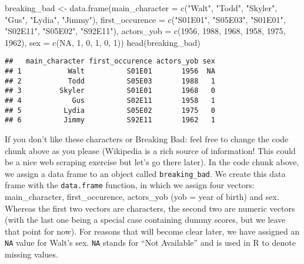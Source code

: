 \documentclass[
]{article}
\newenvironment{Shaded}{\begin{snugshade}}{\end{snugshade}}
\newcommand{\AttributeTok}[1]{\textcolor[rgb]{0.77,0.63,0.00}{#1}}
\newcommand{\ConstantTok}[1]{\textcolor[rgb]{0.00,0.00,0.00}{#1}}
\newcommand{\DecValTok}[1]{\textcolor[rgb]{0.00,0.00,0.81}{#1}}
\newcommand{\FunctionTok}[1]{\textcolor[rgb]{0.00,0.00,0.00}{#1}}
\newcommand{\NormalTok}[1]{#1}
\newcommand{\OtherTok}[1]{\textcolor[rgb]{0.56,0.35,0.01}{#1}}
\newcommand{\StringTok}[1]{\textcolor[rgb]{0.31,0.60,0.02}{#1}}
\begin{document}
\begin{Shaded}
\begin{Highlighting}[]
\NormalTok{breaking\_bad }\OtherTok{\textless{}{-}} \FunctionTok{data.frame}\NormalTok{(}\AttributeTok{main\_character =} \FunctionTok{c}\NormalTok{(}\StringTok{"Walt"}\NormalTok{, }\StringTok{"Todd"}\NormalTok{, }\StringTok{"Skyler"}\NormalTok{, }\StringTok{"Gus"}\NormalTok{, }\StringTok{"Lydia"}\NormalTok{, }\StringTok{"Jimmy"}\NormalTok{),}
                           \AttributeTok{first\_occurence =} \FunctionTok{c}\NormalTok{(}\StringTok{"S01E01"}\NormalTok{, }\StringTok{"S05E03"}\NormalTok{, }\StringTok{"S01E01"}\NormalTok{, }\StringTok{"S02E11"}\NormalTok{, }\StringTok{"S05E02"}\NormalTok{, }\StringTok{"S92E11"}\NormalTok{),}
                           \AttributeTok{actors\_yob =} \FunctionTok{c}\NormalTok{(}\DecValTok{1956}\NormalTok{, }\DecValTok{1988}\NormalTok{, }\DecValTok{1968}\NormalTok{, }\DecValTok{1958}\NormalTok{, }\DecValTok{1975}\NormalTok{, }\DecValTok{1962}\NormalTok{),}
                           \AttributeTok{sex =} \FunctionTok{c}\NormalTok{(}\ConstantTok{NA}\NormalTok{, }\DecValTok{1}\NormalTok{, }\DecValTok{0}\NormalTok{, }\DecValTok{1}\NormalTok{, }\DecValTok{0}\NormalTok{, }\DecValTok{1}\NormalTok{))}
\FunctionTok{head}\NormalTok{(breaking\_bad)}
\end{Highlighting}
\end{Shaded}

\begin{verbatim}
##   main_character first_occurence actors_yob sex
## 1           Walt          S01E01       1956  NA
## 2           Todd          S05E03       1988   1
## 3         Skyler          S01E01       1968   0
## 4            Gus          S02E11       1958   1
## 5          Lydia          S05E02       1975   0
## 6          Jimmy          S92E11       1962   1
\end{verbatim}

If you don't like these characters or Breaking Bad: feel free to change
the code chunk above as you please (Wikipedia is a rich source of
information! This could be a nice web scraping exercise but let's go
there later). In the code chunk above, we assign a data frame to an
object called \texttt{breaking\_bad}. We create this data frame with the
\texttt{data.frame} function, in which we assign four vectors:
main\_character, first\_occurence, actors\_yob (yob = year of birth) and
sex. Whereas the first two vectors are characters, the second two are
numeric vectors (with the last one being a special case containing dummy
scores, but we leave that point for now). For reasons that will become
clear later, we have assigned an \texttt{NA} value for Walt's sex.
\texttt{NA} stands for ``Not Available'' and is used in R to denote
missing values.
\end{document}
